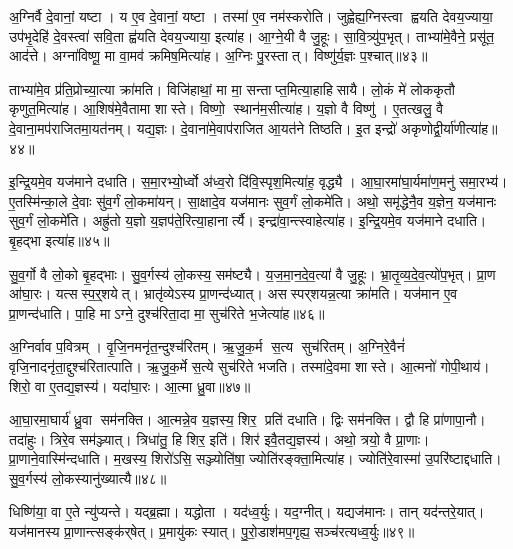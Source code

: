 अ॒ग्निर्वै दे॒वानां॒ यष्टा।
य ए॒व दे॒वानां॒ यष्टा।
तस्मा॑ ए॒व नम॑स्करोति।
जुह्वेह्य॒ग्निस्त्वा ह्वयति देवय॒ज्याया॒ उप॑भृ॒देहि॑ दे॒वस्त्वा॑ सवि॒ता ह्व॑यति देवय॒ज्याया॒ इत्या॑ह।
आ॒ग्ने॒यी वै जु॒हूः।
सा॒वि॒त्र्यु॑प॒भृत्।
ताभ्या॑मे॒वैने॒ प्रसू॑त॒ आद॑त्ते।
अग्ना॑विष्णू॒ मा वा॒मव॑ क्रमिष॒मित्या॑ह।
अ॒ग्निः पु॒रस्तात्।
विष्णु॑र्य॒ज्ञः प॒श्चात्॥४३॥

ताभ्या॑मे॒व प्र॑ति॒प्रोच्या॒त्या क्रा॑मति।
विजि॑हाथां॒ मा मा॒ सन्ताप्त॒मित्या॒हाहिसायै।
लो॒कं मे॑ लोककृतौ कृणुत॒मित्या॑ह।
आ॒शिष॑मे॒वैतामा शास्ते।
विष्णो॒ स्थान॑म॒सीत्या॑ह।
य॒ज्ञो वै विष्णु॑।
ए॒तत्खलु॒ वै दे॒वाना॒मप॑राजितमा॒यत॑नम्।
यद्य॒ज्ञः।
दे॒वाना॑मे॒वाप॑राजित आ॒यत॑ने तिष्ठति।
इ॒त इन्द्रो॑ अकृणोद्वी॒र्या॑णीत्या॑ह॥४४॥

इ॒न्द्रि॒यमे॒व यज॑माने दधाति।
स॒मा॒रभ्यो॒र्ध्वो अ॑ध्व॒रो दि॑वि॒स्पृश॒मित्या॑ह॒ वृद्ध्यै।
आ॒घा॒रमा॑घा॒र्यमा॑ण॒मनु॑ समा॒रभ्य॑।
ए॒तस्मि॑न्का॒ले दे॒वाः सु॑व॒र्गं लो॒कमा॑यन्।
सा॒क्षादे॒व यज॑मानः सुव॒र्गं लो॒कमे॑ति।
अथो॒ समृ॑द्धेनै॒व य॒ज्ञेन॒ यज॑मानः सुव॒र्गं लो॒कमे॑ति।
अह्रु॑तो य॒ज्ञो य॒ज्ञप॑ते॒रित्या॒हानार्त्यै।
इन्द्रा॑वा॒न्त्स्वाहेत्या॑ह।
इ॒न्द्रि॒यमे॒व यज॑माने दधाति।
बृ॒हद्भा इत्या॑ह॥४५॥

सु॒व॒र्गो वै लो॒को बृ॒हद्भाः।
सु॒व॒र्गस्य॑ लो॒कस्य॒ सम॑ष्ट्यै।
य॒ज॒मा॒न॒दे॒व॒त्या॑ वै जु॒हूः।
भ्रा॒तृ॒व्य॒दे॒व॒त्यो॑प॒भृत्।
प्रा॒ण आ॑घा॒रः।
यत्सस्प॒र्॒शयेत्।
भ्रातृ॑व्येऽस्य प्रा॒णन्द॑ध्यात्।
असस्पर्‌शयन्न॒त्या क्रा॑मति।
यज॑मान ए॒व प्रा॒णन्द॑धाति।
पा॒हि माऽग्ने॒ दुश्च॑रिता॒दा मा॒ सुच॑रिते भ॒जेत्या॑ह॥४६॥

अ॒ग्निर्वाव प॒वित्रम्।
वृ॒जि॒नमनृ॑त॒न्दुश्च॑रितम्।
ऋ॒जु॒क॒र्म स॒त्य सुच॑रितम्।
अ॒ग्निरे॒वैनं॑ वृजि॒नादनृ॑ता॒द्दुश्च॑रितात्पाति।
ऋ॒जु॒क॒र्मे स॒त्ये सुच॑रिते भजति।
तस्मा॑दे॒वमा शास्ते।
आ॒त्मनो॑ गोपी॒थाय॑।
शिरो॒ वा ए॒तद्य॒ज्ञस्य॑।
यदा॑घा॒रः।
आ॒त्मा ध्रु॒वा॥४७॥

आ॒घा॒रमा॒घार्य॑ ध्रु॒वा सम॑नक्ति।
आ॒त्मन्ने॒व य॒ज्ञस्य॒ शिर॒ प्रति॑ दधाति।
द्विः सम॑नक्ति।
द्वौ हि प्रा॑णापा॒नौ।
तदा॑हुः।
त्रिरे॒व सम॑ञ्ज्यात्।
त्रिधा॑तु॒ हि शिर॒ इति॑।
शिर॑ इवै॒तद्य॒ज्ञस्य॑।
अथो॒ त्रयो॒ वै प्रा॒णाः।
प्रा॒णाने॒वास्मि॑न्दधाति।
म॒खस्य॒ शिरो॑ऽसि॒ सञ्ज्योति॑षा॒ ज्योति॑रङ्क्ता॒मित्या॑ह।
ज्योति॑रे॒वास्मा॑ उ॒परि॑ष्टाद्दधाति।
सु॒व॒र्गस्य॑ लो॒कस्यानु॑ख्यात्यै॥४८॥\anuvakamend[परि॑दधाति प्रा॒णन्द॑धाति॒ हि य॒ज्ञो घा॑रयति॒ नम॒ इत्या॑ह प॒श्चाद्वी॒र्या॑णीत्या॑ह॒ भा इत्या॑ह भ॒जेत्या॑ह ध्रु॒वैवास्मि॑न्दधाति॒ त्रीणि॑ च]

धिष्णि॑या॒ वा ए॒ते न्यु॑प्यन्ते।
यद्ब्र॒ह्मा।
यद्धोता।
यद॑ध्व॒र्युः।
यद॒ग्नीत्।
यद्यज॑मानः।
तान् यद॑न्तरे॒यात्।
यज॑मानस्य प्रा॒णान्त्सङ्क॑र्‌षेत्।
प्र॒मायु॑कः स्यात्।
पु॒रो॒डाश॑मप॒गृह्य॒ सञ्च॑रत्यध्व॒र्युः॥४९॥

